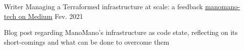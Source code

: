 

\begin{cventries}

  \cventry
    {Writer} %
    {Managing a Terraformed infrastructure at scale: a feedback} %
    {\href{https://medium.com/manomano-tech/managing-a-terraformed-infrastructure-at-scale-a-feedback-43e4675e5769}{manomano-tech on Medium}} %
    {Fev. 2021} %
    {
      \begin{cvitems} %
        \item {Blog post regarding ManoMano's infrastructure as code state, reflecting on its short-comings and what can be done to overcome them}
      \end{cvitems}
    }

\end{cventries}

